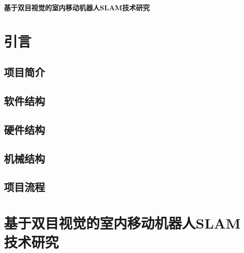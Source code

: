 \documentclass{article}
\begin{document}
\begin{center}
\textbf{基于双目视觉的室内移动机器人SLAM技术研究}{\heiti}
\end{center}
\section{引言}
\subsection{项目简介}
\subsection{软件结构}
\subsection{硬件结构}
\subsection{机械结构}
\subsection{项目流程}
\section{基于双目视觉的室内移动机器人SLAM技术研究}
\end{document}
